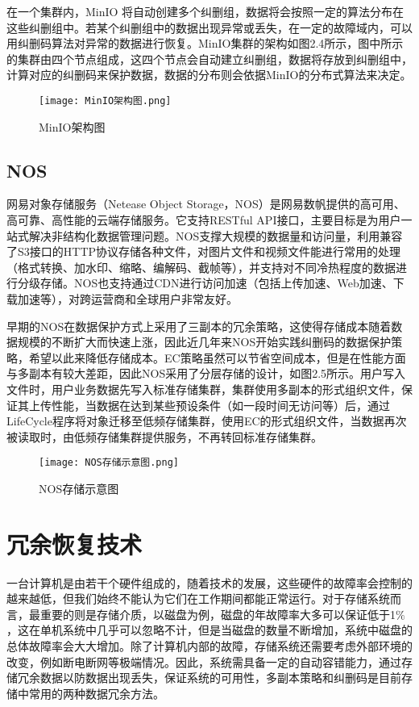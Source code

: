 在一个集群内，MinIO 将自动创建多个纠删组，数据将会按照一定的算法分布在这些纠删组中。若某个纠删组中的数据出现异常或丢失，在一定的故障域内，可以用纠删码算法对异常的数据进行恢复。MinIO集群的架构如图2.4所示，图中所示的集群由四个节点组成，这四个节点会自动建立纠删组，数据将存放到纠删组中，计算对应的纠删码来保护数据，数据的分布则会依据MinIO的分布式算法来决定。

\begin{figure}
    \centering
    \texttt{[image: MinIO架构图.png]}
    \caption{MinIO架构图}
\end{figure}

\subsection{NOS}%
网易对象存储服务（Netease Object Storage，NOS）是网易数帆提供的高可用、高可靠、高性能的云端存储服务。它支持RESTful API接口，主要目标是为用户一站式解决非结构化数据管理问题。NOS支撑大规模的数据量和访问量，利用兼容了S3接口的HTTP协议存储各种文件，对图片文件和视频文件能进行常用的处理（格式转换、加水印、缩略、编解码、截帧等），并支持对不同冷热程度的数据进行分级存储。NOS也支持通过CDN进行访问加速（包括上传加速、Web加速、下载加速等），对跨运营商和全球用户非常友好。

早期的NOS在数据保护方式上采用了三副本的冗余策略，这使得存储成本随着数据规模的不断扩大而快速上涨，因此近几年来NOS开始实践纠删码的数据保护策略，希望以此来降低存储成本。EC策略虽然可以节省空间成本，但是在性能方面与多副本有较大差距，因此NOS采用了分层存储的设计，如图2.5所示。用户写入文件时，用户业务数据先写入标准存储集群，集群使用多副本的形式组织文件，保证其上传性能，当数据在达到某些预设条件（如一段时间无访问等）后，通过LifeCycle程序将对象迁移至低频存储集群，使用EC的形式组织文件，当数据再次被读取时，由低频存储集群提供服务，不再转回标准存储集群。

\begin{figure}
    \centering
    \texttt{[image: NOS存储示意图.png]}
    \caption{NOS存储示意图}
\end{figure}

\section{冗余恢复技术}%
一台计算机是由若干个硬件组成的，随着技术的发展，这些硬件的故障率会控制的越来越低，但我们始终不能认为它们在工作期间都能正常运行。对于存储系统而言，最重要的则是存储介质，以磁盘为例，磁盘的年故障率大多可以保证低于1$\%$\cite{38}，这在单机系统中几乎可以忽略不计，但是当磁盘的数量不断增加，系统中磁盘的总体故障率会大大增加。除了计算机内部的故障，存储系统还需要考虑外部环境的改变，例如断电断网等极端情况。因此，系统需具备一定的自动容错能力，通过存储冗余数据以防数据出现丢失，保证系统的可用性，多副本\cite{39}策略和纠删码\cite{40}是目前存储中常用的两种数据冗余方法。

